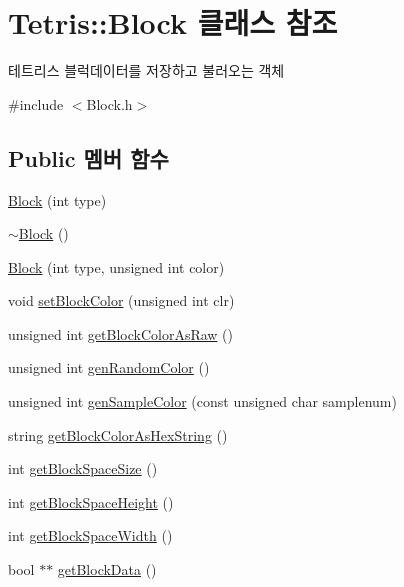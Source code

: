 \hypertarget{class_tetris_1_1_block}{}\section{Tetris\+:\+:Block 클래스 참조}
\label{class_tetris_1_1_block}


테트리스 블럭데이터를 저장하고 불러오는 객체  




{\ttfamily \#include $<$Block.\+h$>$}

\subsection*{Public 멤버 함수}
\begin{DoxyCompactItemize}
\item 
\hyperlink{class_tetris_1_1_block_a1fd0aaff1f4b622c9c7027929c5d4534}{Block} (int type)
\item 
\hyperlink{class_tetris_1_1_block_a20012167d55a996d56825d99082419c6}{$\sim$\+Block} ()
\item 
\hyperlink{class_tetris_1_1_block_a82c3ff96d106bd1da7b32f2addd7db7f}{Block} (int type, unsigned int color)
\item 
void \hyperlink{class_tetris_1_1_block_a1a3fab9e7eabe64a4ba588ed5091d3a9}{set\+Block\+Color} (unsigned int clr)
\item 
unsigned int \hyperlink{class_tetris_1_1_block_a8f6bd5020dcfdae501f74b42827344f3}{get\+Block\+Color\+As\+Raw} ()
\item 
unsigned int \hyperlink{class_tetris_1_1_block_a4bae85cab786853cb3ff76aa7fe72edc}{gen\+Random\+Color} ()
\item 
unsigned int \hyperlink{class_tetris_1_1_block_a9cac65704d2c788488ecf65d5b0467bd}{gen\+Sample\+Color} (const unsigned char samplenum)
\item 
string \hyperlink{class_tetris_1_1_block_a0adf3e3fbe9899115703913f18aaae6d}{get\+Block\+Color\+As\+Hex\+String} ()
\item 
int \hyperlink{class_tetris_1_1_block_a356cba210ff93bbd80c10d4d00c81cc2}{get\+Block\+Space\+Size} ()
\item 
int \hyperlink{class_tetris_1_1_block_a5301977e32c03aaf122fa289fcba77ba}{get\+Block\+Space\+Height} ()
\item 
int \hyperlink{class_tetris_1_1_block_ac390e14de476582300d815d9054ed9bd}{get\+Block\+Space\+Width} ()
\item 
bool $\ast$$\ast$ \hyperlink{class_tetris_1_1_block_a9bd2c3d6ccacff9a5f56f72336ba324f}{get\+Block\+Data} ()
$$
\end{DoxyCompactItemize}

